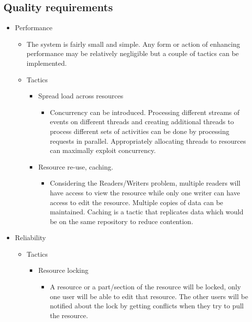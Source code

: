 \documentclass[a4paper,12pt]{article}
\begin{document}
	\subsection{Quality requirements}\label{subsec:quality}
	\begin{itemize}
		\item Performance
		\begin{itemize}
			\item The system is fairly small and simple. Any form or action of enhancing performance may be relatively negligible but a couple of tactics can be implemented. 
			
			\item Tactics
			\begin{itemize}
					\item Spread load across resources
						
						\begin{itemize}
							\item Concurrency can be introduced. Processing different streams of events on different threads and creating additional threads to process different sets of activities can be done by processing requests in parallel. Appropriately allocating threads to resources can maximally exploit concurrency. 
							
						\end{itemize}
					
					\item Resource re-use, caching.
					
						\begin{itemize}
							\item Considering the Readers/Writers problem, multiple readers will have access to view the resource while only one writer can have access to edit the resource. Multiple copies of data can be maintained. Caching is a tactic that replicates data which would be on the same repository to reduce contention.
						\end{itemize}
						
			\end{itemize}		
		\end{itemize}
		\item Reliability
		\begin{itemize}
			
			\item Tactics
			\begin{itemize}
				\item Resource locking
				
					\begin{itemize}
						\item A resource or a part/section of the resource will be locked, only one user will be able to edit that resource. The other users will be notified about the lock by getting conflicts when they try to pull the resource.
					\end{itemize}
										

\end{itemize}
\end{itemize}
\end{itemize}
\end{document}

